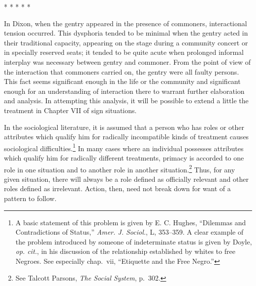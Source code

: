 \documentclass[twoside,symmetric,nobib,justified]{tufte-book}
\begin{document}
\vspace{.2in}
\begin{centering}

\Large{* * * * *}

\end{centering}
\vspace{.17in}

\noindent In Dixon, when the gentry appeared in the presence of commoners,
interactional tension occurred. This dysphoria tended to be minimal when
the gentry acted in their traditional capacity, appearing on the stage
during a community concert or in specially reserved seats; it tended to
be quite acute when prolonged informal interplay was necessary between
gentry and commoner. From the point of view of the interaction that
commoners carried on, the gentry were all faulty persons. This fact
seems significant enough in the life or the community and significant
enough for an understanding of interaction there to warrant further
elaboration and analysis. In attempting this analysis, it will be
possible to extend a little the treatment in Chapter VII of sign
situations.

In the sociological literature, it is assumed that a person who has
roles or other attributes which qualify him for radically incompatible
kinds of treatment causes sociological difficulties.\footnote{A basic
  statement of this problem is given by E. C. Hughes, ``Dilemmas and
  Contradictions of Status,'' \emph{Amer. J. Sociol.}, L, 353--359. A
  clear example of the problem introduced by someone of indeterminate
  status is given by Doyle, \emph{op. cit.}, in his discussion of the
  relationship established by whites to free Negroes. See especially
  chap.~vii, ``Etiquette and the Free Negro.''} In many cases where an
individual possesses attributes which qualify him for radically
different treatments, primacy is accorded to one role in one situation
and to another role in another situation.\footnote{See Talcott Parsons,
  \emph{The Social System}, p.~302.} Thus, for any given situation,
there will always be a role defined as officially relevant and other
roles defined as irrelevant. Action, then, need not break down for want
of a pattern to follow.

\enlargethispage{\baselineskip}
\end{document}

